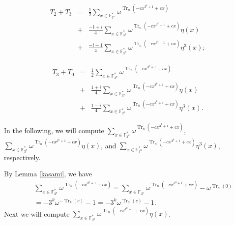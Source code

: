 \documentclass[11pt, reqno]{amsart}
\newcommand{\Ff}{{\mathbb F}}
\def\Tr{\operatorname{Tr}}
\def\Tr{\operatorname{Tr}}
\begin{document}
\begin{eqnarray}
T_2+T_3&=&\frac{1}{2}\sum_{x \in \Ff_{3^n}^*}\omega^{\Tr_n(-cx^{3^k+1}+cx)}\nonumber \\
&+&\frac{-1+i}{4}\sum_{x \in \Ff_{3^n}^*}\omega^{\Tr_n(-cx^{3^k+1}+cx)}\eta(x)\nonumber \\
&+&\frac{-i-1}{4}\sum_{x \in
\Ff_{3^n}^*}\omega^{\Tr_n(-cx^{3^k+1}+cx)}\eta^3(x);\label{tsum2}
\end{eqnarray}

\begin{eqnarray}
T_3+T_0&=&\frac{1}{2}\sum_{x \in \Ff_{3^n}^*}\omega^{\Tr_n(-cx^{3^k+1}+cx)}\nonumber \\
&+&\frac{1+i}{4}\sum_{x \in \Ff_{3^n}^*}\omega^{\Tr_n(-cx^{3^k+1}+cx)}\eta(x)\nonumber \\
&+&\frac{1-i}{4}\sum_{x \in
\Ff_{3^n}^*}\omega^{\Tr_n(-cx^{3^k+1}+cx)}\eta^3(x).\label{tsum3}
\end{eqnarray}

In the following, we will compute
$\sum_{x\in\Ff_{3^n}^*}\omega^{\Tr_n(-cx^{3^k+1}+cx)}$,
$\sum_{x\in \Ff_{3^n}^*}\omega^{\Tr_n(-cx^{3^k+1}+cx)}\eta(x)$,
and
$\sum_{x \in\Ff_{3^n}^*}\omega^{\Tr_n(-cx^{3^k+1}+cx)}\eta^3(x)$, respectively.

By Lemma \ref{kasami}, we have
\begin{eqnarray}
&&\sum_{x \in \Ff_{3^n}^*}\omega^{\Tr_n(-cx^{3^k+1}+cx)}=\sum_{x \in \Ff_{3^n}}\omega^{\Tr_n(-cx^{3^k+1}+cx)}-\omega^{\Tr_n(0)} \nonumber \\
&&=-3^k\omega^{-\Tr_k(c)}-1=-3^k\omega^{\Tr_n(c)}-1. \label{firsum}
\end{eqnarray}
Next we will compute $\sum_{x
\in\Ff_{3^n}^*}\omega^{\Tr_n(-cx^{3^k+1}+cx)}\eta(x)$.\
\end{document}
